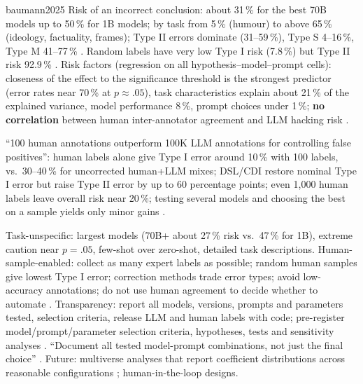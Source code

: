 \begin{papercard}{baumann2025}
 Risk of an incorrect conclusion: about 31\,\% for the best 70B models up to 50\,\% for 1B models; by task from 5\,\% (humour) to above 65\,\% (ideology, factuality, frames); Type II errors dominate (31--59\,\%), Type S 4--16\,\%, Type M 41--77\,\% . Random labels have very low Type I risk (7.8\,\%) but Type II risk 92.9\,\% . Risk factors (regression on all hypothesis--model--prompt cells): closeness of the effect to the significance threshold is the strongest predictor (error rates near 70\,\% at $p\approx.05$), task characteristics explain about 21\,\% of the explained variance, model performance 8\,\%, prompt choices under 1\,\%; \textbf{no correlation} between human inter-annotator agreement and LLM hacking risk .

 ``100 human annotations outperform 100K LLM annotations for controlling false positives'': human labels alone give Type I error around 10\,\% with 100 labels, vs.\ 30--40\,\% for uncorrected human+LLM mixes; DSL/CDI restore nominal Type I error but raise Type II error by up to 60 percentage points; even 1,000 human labels leave overall risk near 20\,\%; testing several models and choosing the best on a sample yields only minor gains .

 Task-unspecific: largest models (70B+ about 27\,\% risk vs.\ 47\,\% for 1B), extreme caution near $p=.05$, few-shot over zero-shot, detailed task descriptions. Human-sample-enabled: collect as many expert labels as possible; random human samples give lowest Type I error; correction methods trade error types; avoid low-accuracy annotations; do not use human agreement to decide whether to automate . Transparency: report all models, versions, prompts and parameters tested, selection criteria, release LLM and human labels with code; pre-register model/prompt/parameter selection criteria, hypotheses, tests and sensitivity analyses . ``Document all tested model-prompt combinations, not just the final choice'' . Future: multiverse analyses that report coefficient distributions across reasonable configurations ; human-in-the-loop designs.


\end{papercard}

